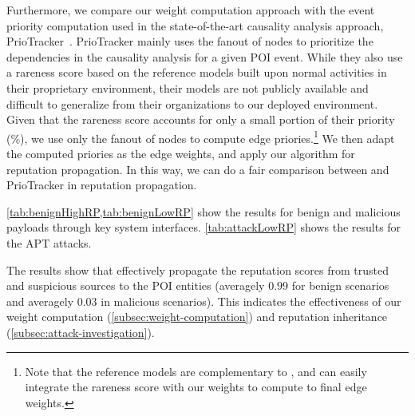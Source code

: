 Furthermore, we compare our weight computation approach with the 
event priority computation used in the state-of-the-art causality analysis approach, PrioTracker~\cite{liu2018priotracker}.
PrioTracker mainly uses the fanout of nodes to prioritize the dependencies in the causality analysis for a given POI event.
While they also use a rareness score based on the reference models built upon normal activities in their proprietary environment, their models are not publicly available and difficult to generalize from their organizations to our deployed environment.
Given that the rareness score accounts for only a small portion of their priority (\%), we use only the fanout of nodes to compute edge priories.\footnote{Note that the reference models are complementary to \tool, and \tool can easily integrate the rareness score with our weights to compute to final edge weights.}
We then adapt the computed priories as the edge weights, and apply our algorithm for reputation propagation.
In this way, we can do a fair comparison between \tool and PrioTracker in reputation propagation.


\cref{tab:benignHighRP,tab:benignLowRP} show the results for benign and malicious payloads through key system interfaces.
\cref{tab:attackLowRP} shows the results for the APT attacks.


The results show that \tool effectively propagate the reputation scores from trusted and suspicious sources to the POI entities (averagely $0.99$ for benign scenarios and averagely $0.03$ in malicious scenarios).
This indicates the effectiveness of our weight computation (\cref{subsec:weight-computation}) and reputation inheritance (\cref{subsec:attack-investigation}).

